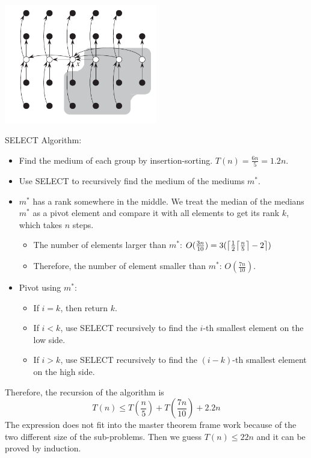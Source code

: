 \documentclass[en,hazy,blue,screen,14pt]{elegantnote}
\DeclarePairedDelimiter{\ceil}{\lceil}{\rceil}
\begin{document}
\centerline{\includegraphics[width=0.5\textwidth]{deterministic-select.png}}

SELECT Algorithm:
\begin{itemize}
\item Find the medium of each group by insertion-sorting. $T(n) = \frac{6n}{5} 
= 1.2n$.
\item Use SELECT to recursively find the medium of the mediums $m^*$.
\item $m^*$ has a rank somewhere in the middle.
We treat the median of the medians $m^*$ as a pivot element and compare it with all elements to get its rank $k$, which takes $n$ steps.
    \begin{itemize}
        \item The number of elements larger than $m^*$: $O(\frac{3n}{10}) 
    =3(\ceil*{\frac{1}{2}\ceil*{\frac{n}{5}} - 2})$
        \item Therefore, the number of element smaller than $m^*$: 
    $O(\frac{7n}{10})$.
    \end{itemize}
\item Pivot using $m^*$:
    \begin{itemize}
     \item If $i = k$, then return $k$.
     \item If $i < k$, use SELECT recursively to find the $i$-th smallest 
element on the low side.
     \item If $i > k$, use SELECT recursively to find the $(i-k)$-th smallest 
element on the high side.
    \end{itemize}
\end{itemize}
Therefore, the recursion of the algorithm is
\[T(n) \le T(\frac{n}{5}) + T(\frac{7n}{10}) + 2.2n\]
The expression does not fit into the master theorem frame work because of the 
two different size of the sub-problems. Then we guess $T(n) \le 22n$ and it can 
be proved by induction.
\end{document}
